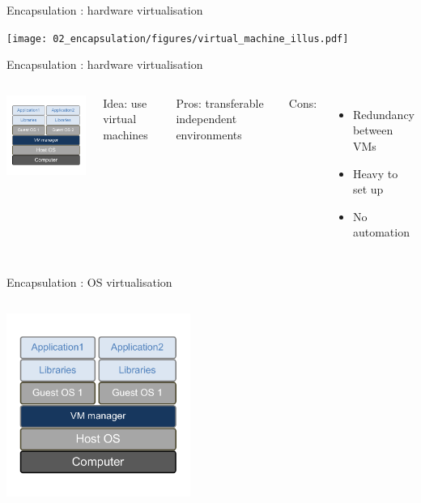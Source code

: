 \begin{frame}{Encapsulation : hardware virtualisation}

\texttt{[image: 02\_encapsulation/figures/virtual\_machine\_illus.pdf]}

\end{frame}

\begin{frame}{Encapsulation : hardware virtualisation}
\begin{columns}

\includegraphics[width=6cm]{02_encapsulation/figures/intro_encapsulation_v2-8.pdf}

Idea: use virtual machines

Pros:  transferable independent environments

Cons:
\begin{itemize}
  \item Redundancy between VMs
  \item Heavy to set up
  \item No automation
\end{itemize}

\end{columns}
\end{frame}

\begin{frame}{Encapsulation : OS virtualisation}
\begin{columns}

\includegraphics[width=6cm]{02_encapsulation/figures/intro_encapsulation_v2-9.pdf}

 

\end{columns}
\end{frame}

